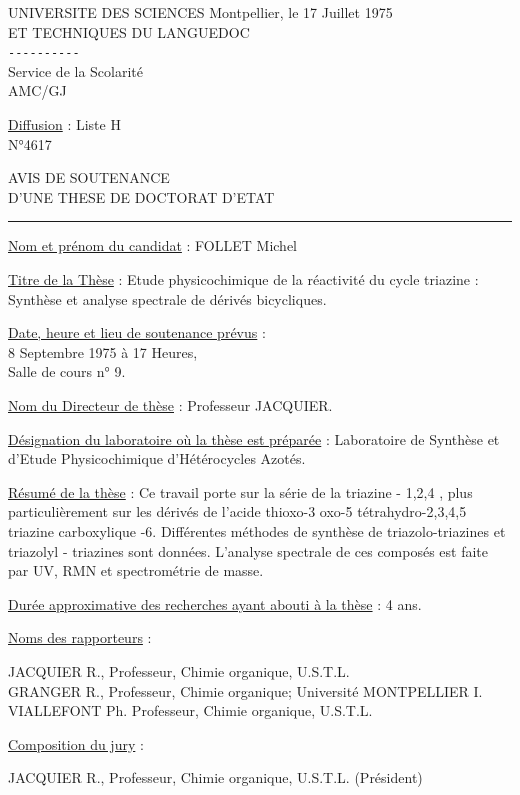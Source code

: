 UNIVERSITE DES SCIENCES \hfill Montpellier, le 17 Juillet 1975\\
ET TECHNIQUES DU LANGUEDOC\\
\texttt{-{}-{}-{}-{}-{}-{}-{}-{}-{}-}\\
Service de la Scolarité\\
AMC/GJ

\uline{Diffusion} : Liste H\\
N°4617

AVIS DE SOUTENANCE\\
D'UNE THESE DE DOCTORAT D'ETAT

\begin{center}\rule{2cm}{0.4pt}\end{center}

\uline{Nom et prénom du candidat} : FOLLET Michel

\uline{Titre de la Thèse} : Etude physicochimique de la réactivité du cycle triazine : Synthèse et analyse spectrale de dérivés bicycliques.

\uline{Date, heure et lieu de soutenance prévus} :\\
8 Septembre 1975 à 17 Heures,\\
Salle de cours n° 9.

\uline{Nom du Directeur de thèse} : Professeur JACQUIER.

\uline{Désignation du laboratoire où la thèse est préparée} : Laboratoire de Synthèse et d'Etude Physicochimique d'Hétérocycles Azotés.

\uline{Résumé de la thèse} : Ce travail porte sur la série de la triazine - 1,2,4 , plus particulièrement sur les dérivés de l'acide thioxo-3 oxo-5 tétrahydro-2,3,4,5 triazine carboxylique -6. Différentes méthodes de synthèse de triazolo-triazines et triazolyl - triazines sont données. L'analyse spectrale de ces composés est faite par UV, RMN et spectrométrie de masse.

\uline{Durée approximative des recherches ayant abouti à la thèse} : 4 ans.

\uline{Noms des rapporteurs} :

JACQUIER R., Professeur, Chimie organique, U.S.T.L.\\
GRANGER R., Professeur, Chimie organique; Université MONTPELLIER I.\\
VIALLEFONT Ph. Professeur, Chimie organique, U.S.T.L.

\uline{Composition du jury} :

JACQUIER R., Professeur, Chimie organique, U.S.T.L. (Président)

